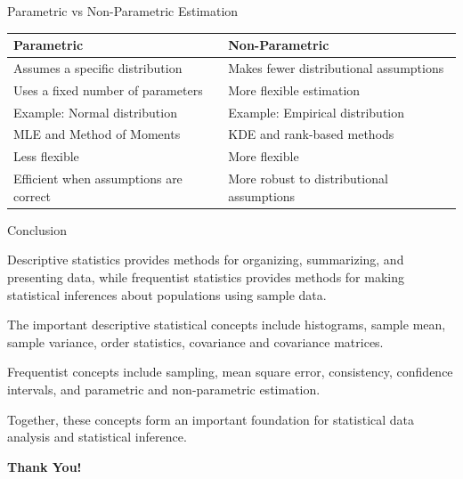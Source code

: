 \documentclass[aspectratio=169]{beamer}
\begin{document}
\begin{frame}{Parametric vs Non-Parametric Estimation}

\begin{center}
\begin{tabular}{p{5.2cm}p{5.2cm}}
\hline
\textbf{Parametric} & \textbf{Non-Parametric}\\
\hline

Assumes a specific distribution &
Makes fewer distributional assumptions \\

Uses a fixed number of parameters &
More flexible estimation \\

Example: Normal distribution &
Example: Empirical distribution \\

MLE and Method of Moments &
KDE and rank-based methods \\

Less flexible &
More flexible \\

Efficient when assumptions are correct &
More robust to distributional assumptions \\

\hline
\end{tabular}
\end{center}

\end{frame}


\begin{frame}{Conclusion}


\item Descriptive statistics provides methods for organizing, summarizing,
and presenting data, while frequentist statistics provides methods for
making statistical inferences about populations using sample data.

\item The important descriptive statistical concepts include histograms,
sample mean, sample variance, order statistics, covariance and
covariance matrices.
\item Frequentist concepts include sampling, mean square
error, consistency, confidence intervals, and parametric and
non-parametric estimation.

\item Together, these concepts form an important foundation for statistical
data analysis and statistical inference.
\end{frame}
\begin{frame}
    \centering
    \vfill
    {\Huge \textbf{Thank You!}}
\end{frame}
\end{document}
